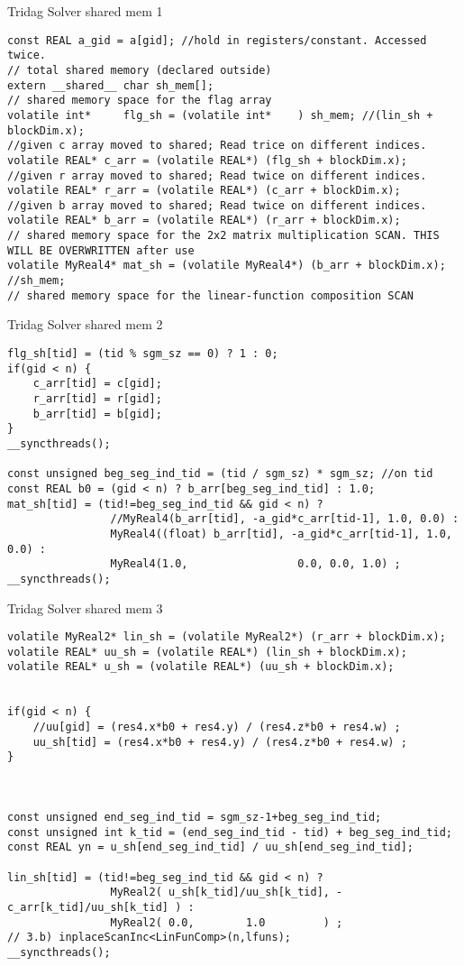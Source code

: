 \documentclass[xcolor=x11names,compress]{beamer}
\begin{document}
\begin{frame}[fragile]{Tridag Solver shared mem 1}
\begin{verbatim}
const REAL a_gid = a[gid]; //hold in registers/constant. Accessed twice.
// total shared memory (declared outside)
extern __shared__ char sh_mem[];
// shared memory space for the flag array
volatile int*     flg_sh = (volatile int*    ) sh_mem; //(lin_sh + blockDim.x);
//given c array moved to shared; Read trice on different indices.
volatile REAL* c_arr = (volatile REAL*) (flg_sh + blockDim.x);
//given r array moved to shared; Read twice on different indices.
volatile REAL* r_arr = (volatile REAL*) (c_arr + blockDim.x);
//given b array moved to shared; Read twice on different indices.
volatile REAL* b_arr = (volatile REAL*) (r_arr + blockDim.x);
// shared memory space for the 2x2 matrix multiplication SCAN. THIS WILL BE OVERWRITTEN after use
volatile MyReal4* mat_sh = (volatile MyReal4*) (b_arr + blockDim.x); //sh_mem;
// shared memory space for the linear-function composition SCAN    
\end{verbatim}
\end{frame}

\begin{frame}[fragile]{Tridag Solver shared mem 2}
\begin{verbatim}
flg_sh[tid] = (tid % sgm_sz == 0) ? 1 : 0;
if(gid < n) {
    c_arr[tid] = c[gid];
    r_arr[tid] = r[gid];
    b_arr[tid] = b[gid];
}
__syncthreads();

const unsigned beg_seg_ind_tid = (tid / sgm_sz) * sgm_sz; //on tid 
const REAL b0 = (gid < n) ? b_arr[beg_seg_ind_tid] : 1.0;
mat_sh[tid] = (tid!=beg_seg_ind_tid && gid < n) ?
                //MyReal4(b_arr[tid], -a_gid*c_arr[tid-1], 1.0, 0.0) :
                MyReal4((float) b_arr[tid], -a_gid*c_arr[tid-1], 1.0, 0.0) :
                MyReal4(1.0,                 0.0, 0.0, 1.0) ;
__syncthreads();
\end{verbatim}
\end{frame}

\begin{frame}[fragile]{Tridag Solver shared mem 3}
\begin{verbatim}
volatile MyReal2* lin_sh = (volatile MyReal2*) (r_arr + blockDim.x);
volatile REAL* uu_sh = (volatile REAL*) (lin_sh + blockDim.x);
volatile REAL* u_sh = (volatile REAL*) (uu_sh + blockDim.x);


if(gid < n) {
    //uu[gid] = (res4.x*b0 + res4.y) / (res4.z*b0 + res4.w) ;
    uu_sh[tid] = (res4.x*b0 + res4.y) / (res4.z*b0 + res4.w) ;
}



const unsigned end_seg_ind_tid = sgm_sz-1+beg_seg_ind_tid;
const unsigned int k_tid = (end_seg_ind_tid - tid) + beg_seg_ind_tid;  
const REAL yn = u_sh[end_seg_ind_tid] / uu_sh[end_seg_ind_tid];

lin_sh[tid] = (tid!=beg_seg_ind_tid && gid < n) ?
                MyReal2( u_sh[k_tid]/uu_sh[k_tid], -c_arr[k_tid]/uu_sh[k_tid] ) :
                MyReal2( 0.0,        1.0         ) ;
// 3.b) inplaceScanInc<LinFunComp>(n,lfuns);
__syncthreads();
\end{verbatim}
\end{frame}
\end{document}
